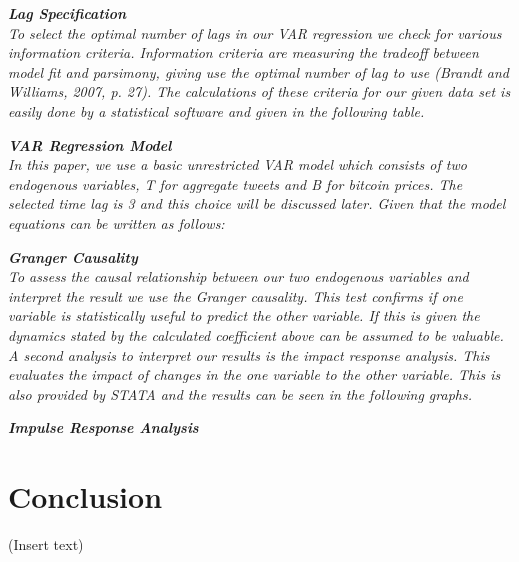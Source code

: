 \documentclass[a4paper,american,12pt]{article}
\begin{document}
\begin{spacing}{1.2}
		\itshape\textbf {Lag Specification}\\
		\textnormal {To select the optimal number of lags in our VAR regression we check for various information criteria. Information criteria are measuring the tradeoff between model fit and parsimony, giving use the optimal number of lag to use (Brandt and Williams, 2007, p. 27). The calculations of these criteria for our given data set is easily done by a statistical software and given in the following table.\\}
		
		\itshape\textbf {VAR Regression Model}\\
		\textnormal {In this paper, we use a basic unrestricted VAR model which consists of two endogenous variables, T for aggregate tweets and B for bitcoin prices. The selected time lag is 3 and this choice will be discussed later. Given that the model equations can be written as follows:\\}
		
		\itshape\textbf {Granger Causality}\\
		\textnormal {To assess the causal relationship between our two endogenous variables and interpret the result we use the Granger causality. This test confirms if one variable is statistically useful to predict the other variable. If this is given the dynamics stated by the calculated coefficient above can be assumed to be valuable.\\
A second analysis to interpret our results is the impact response analysis. This evaluates the impact of changes in the one variable to the other variable. This is also provided by STATA and the results can be seen in the following graphs.}

		\itshape\textbf {Impulse Response Analysis}\\
					
		\clearpage
		
		\section{Conclusion}
		\textnormal {(Insert text)}
		
		\clearpage
		
	\end{spacing}

\clearpage

\printbibliography
\clearpage

\end{document}
